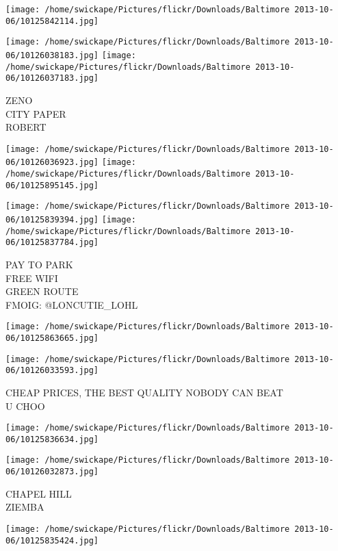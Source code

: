 \documentclass[10pt,letterpaper]{article}
\begin{document}
\texttt{[image: /home/swickape/Pictures/flickr/Downloads/Baltimore 2013-10-06/10125842114.jpg]}

\vspace{0.25in}
\texttt{[image: /home/swickape/Pictures/flickr/Downloads/Baltimore 2013-10-06/10126038183.jpg]}
\texttt{[image: /home/swickape/Pictures/flickr/Downloads/Baltimore 2013-10-06/10126037183.jpg]}

ZENO\\
CITY PAPER\\
ROBERT\\
\pagebreak

\texttt{[image: /home/swickape/Pictures/flickr/Downloads/Baltimore 2013-10-06/10126036923.jpg]}
\texttt{[image: /home/swickape/Pictures/flickr/Downloads/Baltimore 2013-10-06/10125895145.jpg]}

\texttt{[image: /home/swickape/Pictures/flickr/Downloads/Baltimore 2013-10-06/10125839394.jpg]}
\texttt{[image: /home/swickape/Pictures/flickr/Downloads/Baltimore 2013-10-06/10125837784.jpg]}

PAY TO PARK\\
FREE WIFI\\
GREEN ROUTE\\
FMOIG: @LONCUTIE\_LOHL\\
\pagebreak

\texttt{[image: /home/swickape/Pictures/flickr/Downloads/Baltimore 2013-10-06/10125863665.jpg]}

\vspace{0.25in}
\texttt{[image: /home/swickape/Pictures/flickr/Downloads/Baltimore 2013-10-06/10126033593.jpg]}

CHEAP PRICES, THE BEST QUALITY NOBODY CAN BEAT\\
U CHOO\\
\pagebreak

\texttt{[image: /home/swickape/Pictures/flickr/Downloads/Baltimore 2013-10-06/10125836634.jpg]}

\vspace{0.25in}
\texttt{[image: /home/swickape/Pictures/flickr/Downloads/Baltimore 2013-10-06/10126032873.jpg]}

CHAPEL HILL\\
ZIEMBA\\
\pagebreak

\texttt{[image: /home/swickape/Pictures/flickr/Downloads/Baltimore 2013-10-06/10125835424.jpg]}
\end{document}
